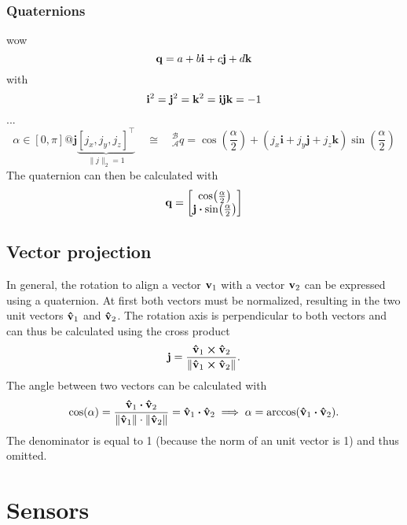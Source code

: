 \subsubsection{Quaternions}
wow
\begin{equation}
	\vb{q} = a + b\vb{i} + c\vb{j} + d\vb{k}
\end{equation}
with
\begin{equation}
	\vb{i}^2 = \vb{j}^2 = \vb{k}^2 = \vb{i}\vb{j}\vb{k} = -1
\end{equation}
...
\begin{equation}
	\alpha \in[0, \pi] @ \mathbf{j} \underbrace{\left[j_{x}, j_{y}, j_{z}\right]^{\top}}_{\|j\|_{2}=1}
	\quad\cong\quad {}^{\mathcal{B}}_{\mathcal{A}} q
	=\cos \left(\frac{\alpha}{2}\right)+\left(j_{x} \mathbf{i}+j_{y} \mathbf{j}+j_{z} \mathbf{k}\right) \sin \left(\frac{\alpha}{2}\right)
	\end{equation}
The quaternion can then be calculated with
\begin{equation}
	\vb{q} =
	\begin{bmatrix}
		\cos(\frac{\alpha}{2})\\
		\vb{j}\vdot\sin(\frac{\alpha}{2})
	\end{bmatrix}
\end{equation}

\subsection{Vector projection}
\label{subsec:vector_projection}
In general, the rotation to align a vector $\vb{v}_1$ with a vector $\vb{v}_2$ can be expressed using a quaternion.
At first both vectors must be normalized, resulting in the two unit vectors $\vu{v}_1$ and $\vu{v}_2$.
The rotation axis is perpendicular to both vectors and can thus be calculated using the cross product
\begin{equation}
    \vb{j} = \frac{\vu{v}_1 \cp \vu{v}_2}{\norm{\vu{v}_1 \cp \vu{v}_2}}.
\end{equation}
The angle between two vectors can be calculated with
\begin{equation}
    \cos(\alpha) = \frac{\vu{v}_1 \vdot \vu{v}_2}{\norm{\vu{v}_1} \cdot \norm{\vu{v}_2}}
    = \vu{v}_1 \vdot \vu{v}_2 \implies
    \alpha = \arccos(\vu{v}_1 \vdot \vu{v}_2).
\end{equation}
The denominator is equal to 1 (because the norm of an unit vector is 1) and thus omitted.



\section{Sensors}
